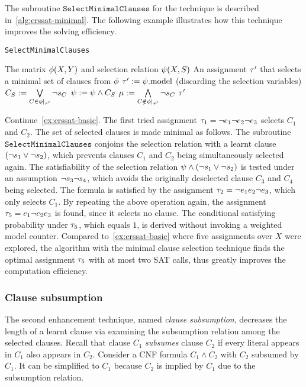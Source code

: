 The subroutine $\texttt{SelectMinimalClauses}$ for the technique is described in~\cref{alg:erssat-minimal}.
The following example illustrates how this technique improves the solving efficiency.

\begin{algorithm}[ht]
    \caption{\texttt{SelectMinimalClauses}}
    \label{alg:erssat-minimal}
    \begin{algorithmic}[1]
        \REQUIRE The matrix $\phi(X,Y)$ and selection relation $\psi(X,S)$
        \ENSURE An assignment $\tau'$ that selects a minimal set of clauses from $\phi$
        \REPEAT
        \STATE $\tau' := \psi.\mathrm{model}$ (discarding the selection variables)
        \STATE $C_S := \bigvee\limits_{C\in\phi|_{\tau'}}\lnot s_{C}$
        \STATE $\psi := \psi \land C_S$
        \STATE $\mu := \bigwedge\limits_{C\notin\phi|_{\tau'}}\lnot s_{C}$
        \UNTIL{($\unsat{\pcf{\select}{\mu}}$)}
        \RETURN $\tau'$
    \end{algorithmic}
\end{algorithm}

\begin{example}
    \label{ex:erssat-minimal}
    Continue~\cref{ex:erssat-basic}.
    The first tried assignment $\tau_1=\lnot e_1 \lnot e_2 \lnot e_3$ selects $C_1$ and $C_2$.
    The set of selected clauses is made minimal as follows.
    The subroutine $\texttt{SelectMinimalClauses}$ conjoins the selection relation with a learnt clause $(\lnot s_{1} \lor \lnot s_{2})$,
    which prevents clauses $C_1$ and $C_2$ being simultaneously selected again.
    The satisfiability of the selection relation $\psi\land(\lnot s_{1} \lor \lnot s_{2})$ is tested under an assumption $\lnot s_{3} \lnot s_{4}$,
    which avoids the originally deselected clause $C_3$ and $C_4$ being selected.
    The formula is satisfied by the assignment $\tau_2=\lnot e_1 e_2 \lnot e_3$, which only selects $C_1$.
    By repeating the above operation again,
    the assignment $\tau_5=e_1 \lnot e_2 e_3$ is found,
    since it selects no clause.
    The conditional satisfying probability under $\tau_5$, which equals $1$,
    is derived without invoking a weighted model counter.
    Compared to~\ref{ex:erssat-basic} where five assignments over $X$ were explored,
    the algorithm with the minimal clause selection technique finds the optimal assignment $\tau_5$ with at most two SAT calls,
    thus greatly improves the computation efficiency.
\end{example}

\subsubsection{Clause subsumption}
The second enhancement technique, named \textit{clause subsumption},
decreases the length of a learnt clause via examining the subsumption relation among the selected clauses.
Recall that clause $C_1$ \textit{subsumes} clause $C_2$ if every literal appears in $C_1$ also appears in $C_2$.
Consider a CNF formula $C_1 \land C_2$ with $C_2$ subsumed by $C_1$.
It can be simplified to $C_1$ because $C_2$ is implied by $C_1$ due to the subsumption relation.

